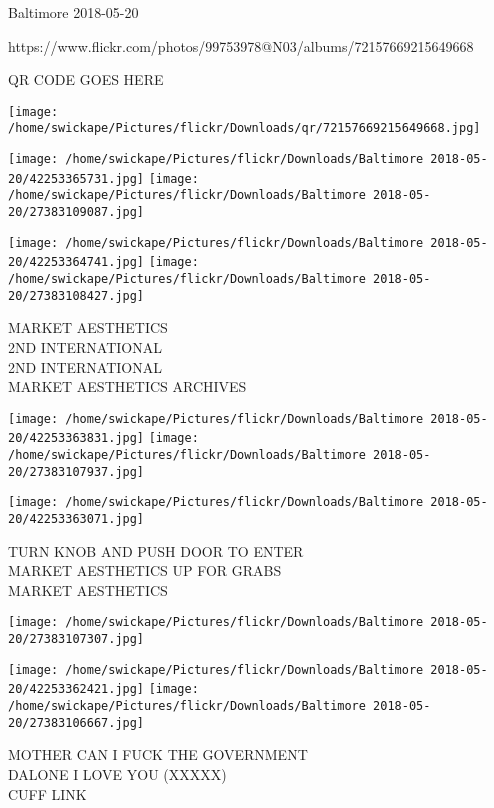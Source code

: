 \documentclass[10pt,letterpaper]{article}
\begin{document}
Baltimore 2018-05-20

https://www.flickr.com/photos/99753978@N03/albums/72157669215649668

QR CODE GOES HERE

\texttt{[image: /home/swickape/Pictures/flickr/Downloads/qr/72157669215649668.jpg]}
\pagebreak

\texttt{[image: /home/swickape/Pictures/flickr/Downloads/Baltimore 2018-05-20/42253365731.jpg]}
\texttt{[image: /home/swickape/Pictures/flickr/Downloads/Baltimore 2018-05-20/27383109087.jpg]}

\texttt{[image: /home/swickape/Pictures/flickr/Downloads/Baltimore 2018-05-20/42253364741.jpg]}
\texttt{[image: /home/swickape/Pictures/flickr/Downloads/Baltimore 2018-05-20/27383108427.jpg]}

MARKET AESTHETICS\\
2ND INTERNATIONAL\\
2ND INTERNATIONAL\\
MARKET AESTHETICS ARCHIVES\\
\pagebreak

\texttt{[image: /home/swickape/Pictures/flickr/Downloads/Baltimore 2018-05-20/42253363831.jpg]}
\texttt{[image: /home/swickape/Pictures/flickr/Downloads/Baltimore 2018-05-20/27383107937.jpg]}

\texttt{[image: /home/swickape/Pictures/flickr/Downloads/Baltimore 2018-05-20/42253363071.jpg]}

TURN KNOB AND PUSH DOOR TO ENTER\\
MARKET AESTHETICS UP FOR GRABS\\
MARKET AESTHETICS\\
\pagebreak

\texttt{[image: /home/swickape/Pictures/flickr/Downloads/Baltimore 2018-05-20/27383107307.jpg]}

\vspace{0.25in}
\texttt{[image: /home/swickape/Pictures/flickr/Downloads/Baltimore 2018-05-20/42253362421.jpg]}
\texttt{[image: /home/swickape/Pictures/flickr/Downloads/Baltimore 2018-05-20/27383106667.jpg]}

MOTHER CAN I FUCK THE GOVERNMENT\\
DALONE I LOVE YOU (XXXXX)\\
CUFF LINK\\
\pagebreak
\end{document}
